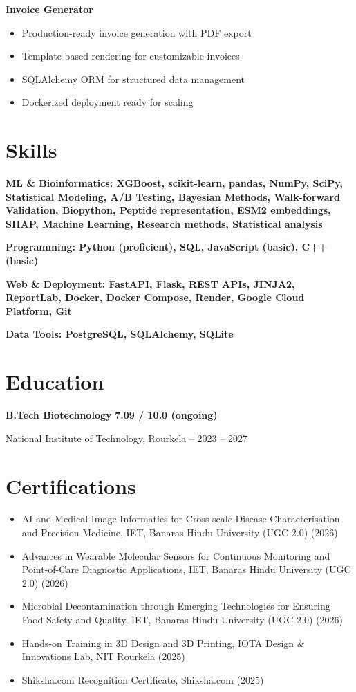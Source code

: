 \documentclass[11pt,a4paper]{article}
\begin{document}
\noindent\textbf{Invoice Generator} \hfill \href{https://github.com/jiyanshusingh/invoice-generator}{\faGithub}
\begin{itemize}
    \item Production-ready invoice generation with PDF export
    \item Template-based rendering for customizable invoices
    \item SQLAlchemy ORM for structured data management
    \item Dockerized deployment ready for scaling
\end{itemize}

\section*{Skills}
\noindent\textbf{ML \& Bioinformatics: XGBoost, scikit-learn, pandas, NumPy, SciPy, Statistical Modeling, A/B Testing, Bayesian Methods, Walk-forward Validation, Biopython, Peptide representation, ESM2 embeddings, SHAP, Machine Learning, Research methods, Statistical analysis}

\noindent\textbf{Programming: Python (proficient), SQL, JavaScript (basic), C++ (basic)}

\noindent\textbf{Web \& Deployment: FastAPI, Flask, REST APIs, JINJA2, ReportLab, Docker, Docker Compose, Render, Google Cloud Platform, Git}

\noindent\textbf{Data Tools: PostgreSQL, SQLAlchemy, SQLite}

\section*{Education}
\noindent\textbf{B.Tech Biotechnology} \hfill \textbf{7.09 / 10.0 (ongoing)}

\noindent National Institute of Technology, Rourkela -- 2023 – 2027

\section*{Certifications}
\begin{itemize}
    \item AI and Medical Image Informatics for Cross-scale Disease Characterisation and Precision Medicine, IET, Banaras Hindu University (UGC 2.0) (2026)
    \item Advances in Wearable Molecular Sensors for Continuous Monitoring and Point-of-Care Diagnostic Applications, IET, Banaras Hindu University (UGC 2.0) (2026)
    \item Microbial Decontamination through Emerging Technologies for Ensuring Food Safety and Quality, IET, Banaras Hindu University (UGC 2.0) (2026)
    \item Hands-on Training in 3D Design and 3D Printing, IOTA Design \& Innovations Lab, NIT Rourkela (2025)
    \item Shiksha.com Recognition Certificate, Shiksha.com (2025)
\end{itemize}
\end{document}
